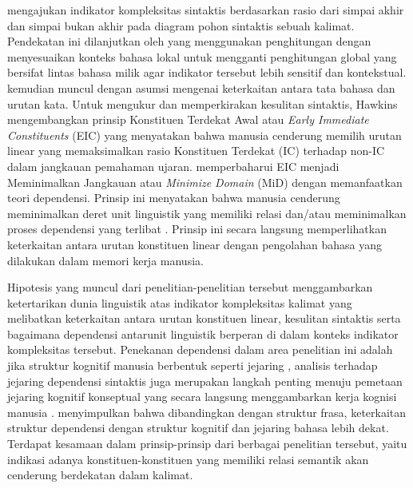 \cite{miller1963finitary} mengajukan indikator kompleksitas sintaktis berdasarkan rasio dari simpai akhir dan simpai bukan akhir pada diagram pohon sintaktis sebuah kalimat. Pendekatan ini dilanjutkan oleh \cite{frazier1985syntactic} yang menggunakan penghitungan dengan menyesuaikan konteks bahasa lokal untuk mengganti penghitungan global yang bersifat lintas bahasa milik \cite{miller1963finitary} agar indikator tersebut lebih sensitif dan kontekstual. \cite{hawkins1994performance} kemudian muncul dengan asumsi mengenai keterkaitan antara tata bahasa dan urutan kata. Untuk mengukur dan memperkirakan kesulitan sintaktis, Hawkins mengembangkan prinsip Konstituen Terdekat Awal atau \textit{Early Immediate Constituents} (EIC) yang menyatakan bahwa manusia cenderung memilih urutan linear yang memaksimalkan rasio Konstituen Terdekat (IC) terhadap non-IC dalam jangkauan pemahaman ujaran. \cite{hawkins2004efficiency} memperbaharui EIC menjadi Meminimalkan Jangkauan atau \textit{Minimize Domain} (MiD) dengan memanfaatkan teori dependensi. Prinsip ini menyatakan bahwa manusia cenderung meminimalkan deret unit linguistik yang memiliki relasi dan/atau meminimalkan proses dependensi yang terlibat \citep{hawkins2004efficiency}. Prinsip ini secara langsung memperlihatkan keterkaitan antara urutan konstituen linear dengan pengolahan bahasa yang dilakukan dalam memori kerja manusia.

Hipotesis yang muncul dari penelitian-penelitian tersebut menggambarkan ketertarikan dunia linguistik atas indikator kompleksitas kalimat yang melibatkan keterkaitan antara urutan konstituen linear, kesulitan sintaktis serta bagaimana dependensi antarunit linguistik berperan di dalam konteks indikator kompleksitas tersebut. Penekanan dependensi dalam area penelitian ini adalah jika struktur kognitif manusia berbentuk seperti jejaring \citep{hudson2007language}, analisis terhadap jejaring dependensi sintaktis juga merupakan langkah penting menuju pemetaan jejaring kognitif konseptual yang secara langsung menggambarkan kerja kognisi manusia \citep{liu2008dependency}. \cite{liu2008dependency} menyimpulkan bahwa dibandingkan dengan struktur frasa, keterkaitan struktur dependensi dengan struktur kognitif dan jejaring bahasa lebih dekat. Terdapat kesamaan dalam prinsip-prinsip dari berbagai penelitian tersebut, yaitu indikasi adanya konstituen-konstituen yang memiliki relasi semantik akan cenderung berdekatan dalam kalimat. 

